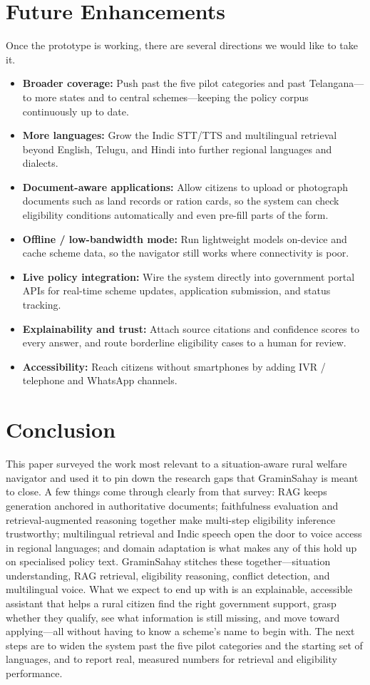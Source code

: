 \documentclass[conference]{IEEEtran}
\begin{document}
\section{Future Enhancements}
\label{sec:future}
Once the prototype is working, there are several directions we would like to take it.
\begin{itemize}
\item \textbf{Broader coverage:} Push past the five pilot categories and past Telangana---to more states and to central schemes---keeping the policy corpus continuously up to date.
\item \textbf{More languages:} Grow the Indic STT/TTS and multilingual retrieval beyond English, Telugu, and Hindi into further regional languages and dialects.
\item \textbf{Document-aware applications:} Allow citizens to upload or photograph documents such as land records or ration cards, so the system can check eligibility conditions automatically and even pre-fill parts of the form.
\item \textbf{Offline / low-bandwidth mode:} Run lightweight models on-device and cache scheme data, so the navigator still works where connectivity is poor.
\item \textbf{Live policy integration:} Wire the system directly into government portal APIs for real-time scheme updates, application submission, and status tracking.
\item \textbf{Explainability and trust:} Attach source citations and confidence scores to every answer, and route borderline eligibility cases to a human for review.
\item \textbf{Accessibility:} Reach citizens without smartphones by adding IVR / telephone and WhatsApp channels.
\end{itemize}

\section{Conclusion}
\label{sec:conclusion}
This paper surveyed the work most relevant to a situation-aware rural welfare navigator and used it to pin down the research gaps that GraminSahay is meant to close. A few things come through clearly from that survey: RAG keeps generation anchored in authoritative documents; faithfulness evaluation and retrieval-augmented reasoning together make multi-step eligibility inference trustworthy; multilingual retrieval and Indic speech open the door to voice access in regional languages; and domain adaptation is what makes any of this hold up on specialised policy text. GraminSahay stitches these together---situation understanding, RAG retrieval, eligibility reasoning, conflict detection, and multilingual voice. What we expect to end up with is an explainable, accessible assistant that helps a rural citizen find the right government support, grasp whether they qualify, see what information is still missing, and move toward applying---all without having to know a scheme's name to begin with. The next steps are to widen the system past the five pilot categories and the starting set of languages, and to report real, measured numbers for retrieval and eligibility performance.
\end{document}
